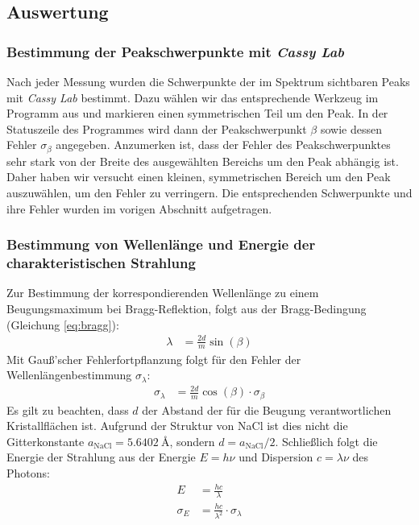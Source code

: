 \documentclass[11pt, a4paper]{article}
\begin{document}
\subsection{Auswertung}

\subsubsection{Bestimmung der Peakschwerpunkte mit \emph{Cassy Lab}}
Nach jeder Messung wurden die Schwerpunkte der im Spektrum sichtbaren Peaks mit \emph{Cassy Lab} bestimmt.
Dazu wählen wir das entsprechende Werkzeug im Programm aus und markieren einen symmetrischen Teil um den Peak.
In der Statuszeile des Programmes wird dann der Peakschwerpunkt $\beta$ sowie dessen Fehler $\sigma_\beta$ angegeben.
Anzumerken ist, dass der Fehler des Peakschwerpunktes sehr stark von der Breite des ausgewählten Bereichs um den Peak abhängig ist.
Daher haben wir versucht einen kleinen, symmetrischen Bereich um den Peak auszuwählen, um den Fehler zu verringern.
Die entsprechenden Schwerpunkte und ihre Fehler wurden im vorigen Abschnitt aufgetragen.

\subsubsection{Bestimmung von Wellenlänge und Energie der charakteristischen Strahlung}
\label{sssec:lambdaE}
Zur Bestimmung der korrespondierenden Wellenlänge zu einem Beugungsmaximum bei Bragg-Reflektion, folgt aus der Bragg-Bedingung (Gleichung \ref{eq:bragg}):
\begin{align}
  \lambda &= \frac{2d}{m} \sin(\beta)
\end{align}
Mit Gauß'scher Fehlerfortpflanzung folgt für den Fehler der Wellenlängenbestimmung $\sigma_\lambda$:
\begin{align}
  \sigma_\lambda &= \frac{2d}{m} \cos(\beta) \cdot \sigma_\beta
\end{align}
Es gilt zu beachten, dass $d$ der Abstand der für die Beugung verantwortlichen Kristallflächen ist.
Aufgrund der Struktur von NaCl ist dies nicht die Gitterkonstante $a_\mathrm{NaCl} = \SI{5,6402}{\angstrom}$\cite{crc}, sondern $d = a_\mathrm{NaCl}/2 $.
Schließlich folgt die Energie der Strahlung aus der Energie $E = h\nu$ und Dispersion $ c = \lambda \nu$ des Photons:
\begin{align}
  E &= \frac{h c}{\lambda} \\
  \sigma_E &= \frac{h c}{\lambda^2} \cdot \sigma_\lambda
\end{align}
\end{document}
